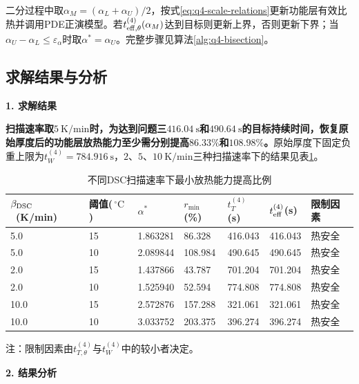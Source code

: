 二分过程中取$\alpha_M=(\alpha_L+\alpha_U)/2$，按式\eqref{eq:q4-scale-relations}更新功能层有效比热并调用PDE正演模型。若$t_{\rm eff,\theta}^{(4)}(\alpha_M)$达到目标则更新上界，否则更新下界；当$\alpha_U-\alpha_L\le\varepsilon_\alpha$时取$\alpha^*=\alpha_U$。完整步骤见算法\ref{alg:q4-bisection}。



\subsection{求解结果与分析}

\noindent\textbf{1. 求解结果}\par

\textbf{扫描速率取$5\ \mathrm{K/min}$时，为达到问题三$416.04\ \mathrm s$和$490.64\ \mathrm s$的目标持续时间，恢复原始厚度后的功能层放热能力至少需分别提高$86.33\%$和$108.98\%$。}原始厚度下固定负重上限为$t_W^{(4)}=784.916\ \mathrm s$，$2$、$5$、$10\ \mathrm{K/min}$三种扫描速率下的结果见表\ref{tab:q4-results}。

\begin{table}[!htbp]
\centering
\caption{不同DSC扫描速率下最小放热能力提高比例}
\label{tab:q4-results}
\begingroup
{}
\begin{tabularx}{\textwidth}{XXXXXXX}  %
\toprule
\rowcolor{cyan!50!blue!30}
$\beta_{\rm DSC}$\ (K/min) & 阈值($\,^{\circ}\mathrm C$) & $\alpha^*$ & $r_{\min}$(\%) & $t_T^{(4)}$(s) & $t_{\rm eff}^{(4)}$(s) & 限制因素 \\
\midrule
5.0 & 15 & 1.863281 & 86.328 & 416.043 & 416.043 & 热安全 \\
5.0 & 10 & 2.089844 & 108.984 & 490.645 & 490.645 & 热安全 \\
2.0 & 15 & 1.437866 & 43.787 & 701.204 & 701.204 & 热安全 \\
2.0 & 10 & 1.525940 & 52.594 & 774.808 & 774.808 & 热安全 \\
10.0 & 15 & 2.572876 & 157.288 & 321.061 & 321.061 & 热安全 \\
10.0 & 10 & 3.033752 & 203.375 & 396.274 & 396.274 & 热安全 \\
\bottomrule
\end{tabularx}
\endgroup
\smallskip
\flushleft\footnotesize{注：限制因素由$t_{T,\theta}^{(4)}$与$t_W^{(4)}$中的较小者决定。}
\end{table}

\noindent\textbf{2. 结果分析}\par

